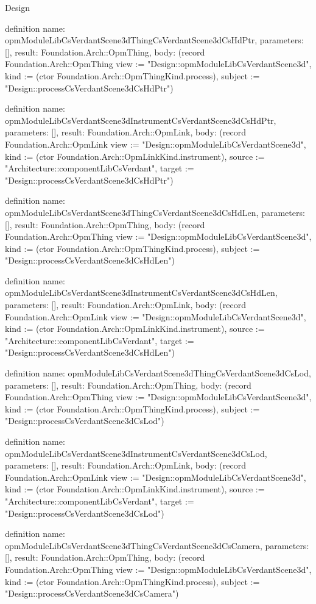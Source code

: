 \begin{lexlean}{Design}
\begin{semanticmodule}
definition{
  name: opmModuleLibCsVerdantScene3dThingCsVerdantScene3dCsHdPtr,
  parameters: [],
  result: Foundation.Arch::OpmThing,
  body: (record Foundation.Arch::OpmThing {view := "Design::opmModuleLibCsVerdantScene3d", kind := (ctor Foundation.Arch::OpmThingKind.process), subject := "Design::processCsVerdantScene3dCsHdPtr"})
}

definition{
  name: opmModuleLibCsVerdantScene3dInstrumentCsVerdantScene3dCsHdPtr,
  parameters: [],
  result: Foundation.Arch::OpmLink,
  body: (record Foundation.Arch::OpmLink {view := "Design::opmModuleLibCsVerdantScene3d", kind := (ctor Foundation.Arch::OpmLinkKind.instrument), source := "Architecture::componentLibCsVerdant", target := "Design::processCsVerdantScene3dCsHdPtr"})
}

definition{
  name: opmModuleLibCsVerdantScene3dThingCsVerdantScene3dCsHdLen,
  parameters: [],
  result: Foundation.Arch::OpmThing,
  body: (record Foundation.Arch::OpmThing {view := "Design::opmModuleLibCsVerdantScene3d", kind := (ctor Foundation.Arch::OpmThingKind.process), subject := "Design::processCsVerdantScene3dCsHdLen"})
}

definition{
  name: opmModuleLibCsVerdantScene3dInstrumentCsVerdantScene3dCsHdLen,
  parameters: [],
  result: Foundation.Arch::OpmLink,
  body: (record Foundation.Arch::OpmLink {view := "Design::opmModuleLibCsVerdantScene3d", kind := (ctor Foundation.Arch::OpmLinkKind.instrument), source := "Architecture::componentLibCsVerdant", target := "Design::processCsVerdantScene3dCsHdLen"})
}

definition{
  name: opmModuleLibCsVerdantScene3dThingCsVerdantScene3dCsLod,
  parameters: [],
  result: Foundation.Arch::OpmThing,
  body: (record Foundation.Arch::OpmThing {view := "Design::opmModuleLibCsVerdantScene3d", kind := (ctor Foundation.Arch::OpmThingKind.process), subject := "Design::processCsVerdantScene3dCsLod"})
}

definition{
  name: opmModuleLibCsVerdantScene3dInstrumentCsVerdantScene3dCsLod,
  parameters: [],
  result: Foundation.Arch::OpmLink,
  body: (record Foundation.Arch::OpmLink {view := "Design::opmModuleLibCsVerdantScene3d", kind := (ctor Foundation.Arch::OpmLinkKind.instrument), source := "Architecture::componentLibCsVerdant", target := "Design::processCsVerdantScene3dCsLod"})
}

definition{
  name: opmModuleLibCsVerdantScene3dThingCsVerdantScene3dCsCamera,
  parameters: [],
  result: Foundation.Arch::OpmThing,
  body: (record Foundation.Arch::OpmThing {view := "Design::opmModuleLibCsVerdantScene3d", kind := (ctor Foundation.Arch::OpmThingKind.process), subject := "Design::processCsVerdantScene3dCsCamera"})
}


\end{semanticmodule}
\end{lexlean}
